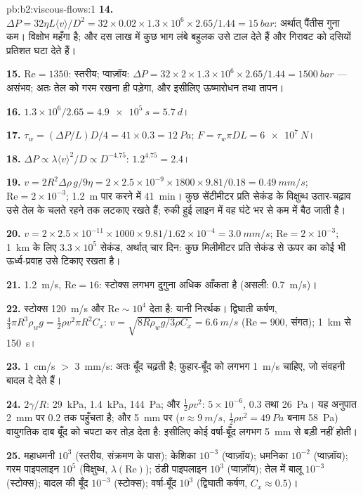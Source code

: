 \begin{solution}{pb:b2:viscous-flows:1}
\textbf{14.} $\Delta P = 32\eta L\langle v\rangle/D^2 = 32 \times 0.02 \times 1.3 \times 10^6
\times 2.65/1.44 = \qty{15}{bar}$: अर्थात् पैंतीस गुना कम। विक्षोभ
महँगा है; और दस लाख में कुछ भाग लंबे बहुलक उसे टाल देते हैं और
गिरावट को दसियों प्रतिशत घटा देते हैं।

\textbf{15.} $\mathrm{Re} = 1350$: स्तरीय; प्वाज़ॉय: $\Delta P = 32 \times 2 \times 1.3 \times
10^6 \times 2.65/1.44 = \qty{1500}{bar}$ --- असंभव; अतः तेल को गरम रखना ही
पड़ेगा, और इसीलिए ऊष्मारोधन तथा तापन।

\textbf{16.} $1.3 \times 10^6/2.65 = \qty{4.9e5}{s} = \qty{5.7}{d}$।

\textbf{17.} $\tau_w = (\Delta P/L)D/4 = 41 \times 0.3 = \qty{12}{Pa}$; $F = \tau_w\pi DL =
\qty{6e7}{N}$।

\textbf{18.} $\Delta P \propto \lambda\langle v\rangle^2/D \propto D^{-4.75}$: $1.2^{4.75} = 2.4$।

\textbf{19.} $v = 2R^2\Delta\rho\,g/9\eta = 2 \times 2.5 \times 10^{-9} \times 1800 \times 9.81/
0.18 = \qty{0.49}{mm/s}$; $\mathrm{Re} = 2 \times 10^{-3}$; \qty{1.2}{m} पार करने में
\qty{41}{min}। कुछ सेंटीमीटर प्रति सेकंड के विक्षुब्ध उतार-चढ़ाव
उसे तेल के चलते रहने तक लटकाए रखते हैं; रुकी हुई लाइन में वह
घंटे भर से कम में बैठ जाती है।

\textbf{20.} $v = 2 \times 2.5 \times 10^{-11} \times 1000 \times 9.81/1.62 \times 10^{-4} =
\qty{3.0}{mm/s}$; $\mathrm{Re} = 2 \times 10^{-3}$; \qty{1}{km} के लिए $3.3 \times 10^5$ सेकंड, अर्थात् चार
दिन: कुछ मिलीमीटर प्रति सेकंड से ऊपर का कोई भी ऊर्ध्व-प्रवाह उसे टिकाए रखता है।

\textbf{21.} \qty{1.2}{m/s}, $\mathrm{Re} = 16$: स्टोक्स लगभग दुगुना
अधिक आँकता है (असली: \qty{0.7}{m/s})।

\textbf{22.} स्टोक्स \qty{120}{m/s} और $\mathrm{Re} \sim 10^4$ देता है: यानी निरर्थक।
द्विघाती कर्षण, $\tfrac43\pi R^3\rho_wg = \tfrac12\rho v^2\pi R^2C_x$: $v = \sqrt{8R
\rho_wg/3\rho C_x} = \qty{6.6}{m/s}$ ($\mathrm{Re} = 900$, संगत); \qty{1}{km} से
\qty{150}{s}।

\textbf{23.} \qty{1}{cm/s} $>$ \qty{3}{mm/s}: अतः बूँद चढ़ती है; फुहार-बूँद को
लगभग \qty{1}{m/s} चाहिए, जो संवहनी बादल दे देते हैं।

\textbf{24.} $2\gamma/R$: \qty{29}{kPa}, \qty{1.4}{kPa}, \qty{144}{Pa}; और  $\tfrac12\rho v^2$: $5 \times 10^{-6}$, $0.3$ तथा \qty{26}{Pa}। यह अनुपात
\qty{2}{mm} पर $0.2$ तक पहुँचता है; और \qty{5}{mm} पर ($v \approx \qty{9}{m/s}$, $\tfrac12\rho v^2 =
\qty{49}{Pa}$ बनाम \qty{58}{Pa}) वायुगतिक दाब बूँद को चपटा
कर तोड़ देता है: इसीलिए कोई वर्षा-बूँद लगभग \qty{5}{mm} से बड़ी नहीं होती।

\textbf{25.} महाधमनी $10^3$ (स्तरीय, संक्रमण के पास); केशिका $10^{-3}$
(प्वाज़ॉय); धमनिका $10^{-2}$ (प्वाज़ॉय); गरम पाइपलाइन $10^5$
(विक्षुब्ध, $\lambda(\mathrm{Re})$); ठंडी पाइपलाइन $10^3$ (प्वाज़ॉय); तेल में बालू
$10^{-3}$ (स्टोक्स); बादल की बूँद $10^{-3}$ (स्टोक्स); वर्षा-बूँद $10^3$
(द्विघाती कर्षण, $C_x \approx 0.5$)।
\end{solution}
